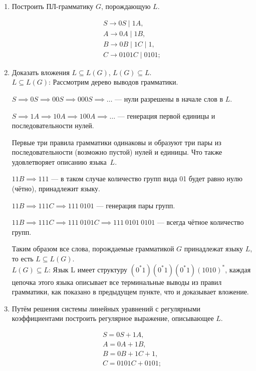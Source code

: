 \documentclass[fleqn,12pt, a4paper]{article}
\begin{document}
\begin{enumerate}[label=(\roman{*})]
	\item Построить ПЛ-грамматику $G$, порождающую $L$.

	\begin{equation}
		\begin{array}{l}
			S \to 0S \mid 1A, \\
			A \to 0A \mid 1B, \\
			B \to 0B \mid 1C \mid 1, \\
			C \to 0101C \mid 0101;
		\end{array}
	\end{equation}

	\item Доказать вложения $L \subseteq L(G)$, $L(G) \subseteq L$.\\

	\underline{$L \subseteq L(G)$}: Рассмотрим дерево выводов грамматики.

	$S \implies 0S \implies 00S \implies 000S \implies \dots$ --- нули разрешены в начале слов в $L$.

	$S \implies 1A \implies 10A \implies 100A \implies \dots$ --- генерация первой единицы и последовательности нулей.

	Первые три правила грамматики одинаковы и образуют три пары из последовательности (возможно пустой) нулей и единицы. Что также удовлетворяет описанию языка~$L$.

	$11B \implies 111 $ --- в таком случае количество групп вида 01 будет равно нулю (чётно), принадлежит языку.

	$11B \implies 111C \implies 111\ 0101$ --- генерация пары групп.

	$11B \implies 111C \implies 111\ 0101C \implies 111\ 0101\ 0101$ --- всегда чётное количество групп.

	Таким образом все слова, порождаемые грамматикой $G$ принадлежат языку $L$, то есть $L \subseteq L(G)$.\\


	\underline{$L(G) \subseteq L$}: Язык L имеет структуру $(0^*1)(0^*1)(0^*1)(1010)^*$, каждая цепочка этого языка описывает все терминальные выводы из правил
	 грамматики, как показано в предыдущем пункте, что и доказывает вложение.

	\item Путём решения системы линейных уравнений с регулярными коэффициентами построить регулярное выражение, описывающее $L$.


	\begin{equation}
		\begin{array}{l}
		S = 0S + 1A, \\
		A = 0A + 1B, \\
		B = 0B + 1C + 1, \\
		C = 0101C + 0101; \\\\


\end{array}
\end{equation}
\end{enumerate}
\end{document}

